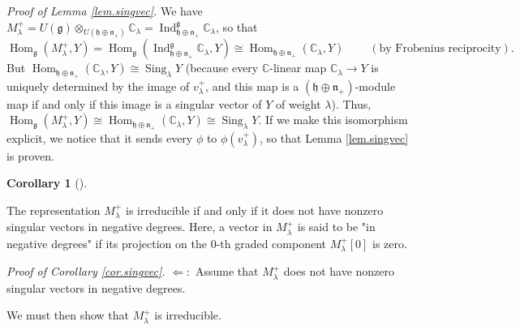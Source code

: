 \documentclass
[numbers=enddot,12pt,final,onecolumn,german,notitlepage]{scrartcl}%
\theoremstyle{definition}
\newtheorem{coro}[theo]{Corollary}
\newenvironment{corollary}[1][]
{\begin{coro}[#1]\begin{leftbar}}
{\end{leftbar}\end{coro}}
\begin{document}
\textit{Proof of Lemma \ref{lem.singvec}.} We have $M_{\lambda}^{+}=U\left(
\mathfrak{g}\right)  \otimes_{U\left(  \mathfrak{h}\oplus\mathfrak{n}%
_{+}\right)  }\mathbb{C}_{\lambda}=\operatorname*{Ind}\nolimits_{\mathfrak{h}%
\oplus\mathfrak{n}_{+}}^{\mathfrak{g}}\mathbb{C}_{\lambda}$, so that
\[
\operatorname*{Hom}\nolimits_{\mathfrak{g}}\left(  M_{\lambda}^{+},Y\right)
=\operatorname*{Hom}\nolimits_{\mathfrak{g}}\left(  \operatorname*{Ind}%
\nolimits_{\mathfrak{h}\oplus\mathfrak{n}_{+}}^{\mathfrak{g}}\mathbb{C}%
_{\lambda},Y\right)  \cong\operatorname*{Hom}\nolimits_{\mathfrak{h}%
\oplus\mathfrak{n}_{+}}\left(  \mathbb{C}_{\lambda},Y\right)
\ \ \ \ \ \ \ \ \ \ \left(  \text{by Frobenius reciprocity}\right)  .
\]
But $\operatorname*{Hom}\nolimits_{\mathfrak{h}\oplus\mathfrak{n}_{+}}\left(
\mathbb{C}_{\lambda},Y\right)  \cong\operatorname*{Sing}\nolimits_{\lambda}Y$
(because every $\mathbb{C}$-linear map $\mathbb{C}_{\lambda}\rightarrow Y$ is
uniquely determined by the image of $v_{\lambda}^{+}$, and this map is a
$\left(  \mathfrak{h}\oplus\mathfrak{n}_{+}\right)  $-module map if and only
if this image is a singular vector of $Y$ of weight $\lambda$). Thus,
$\operatorname*{Hom}\nolimits_{\mathfrak{g}}\left(  M_{\lambda}^{+},Y\right)
\cong\operatorname*{Hom}\nolimits_{\mathfrak{h}\oplus\mathfrak{n}_{+}}\left(
\mathbb{C}_{\lambda},Y\right)  \cong\operatorname*{Sing}\nolimits_{\lambda}Y$.
If we make this isomorphism explicit, we notice that it sends every $\phi$ to
$\phi\left(  v_{\lambda}^{+}\right)  $, so that Lemma \ref{lem.singvec} is proven.

\begin{corollary}
\label{cor.singvec}The representation $M_{\lambda}^{+}$ is irreducible if and
only if it does not have nonzero singular vectors in negative degrees. Here, a
vector in $M_{\lambda}^{+}$ is said to be "in negative degrees" if its
projection on the $0$-th graded component $M_{\lambda}^{+}\left[  0\right]  $
is zero.
\end{corollary}

\textit{Proof of Corollary \ref{cor.singvec}.} $\Longleftarrow:$ Assume that
$M_{\lambda}^{+}$ does not have nonzero singular vectors in negative degrees.

We must then show that $M_{\lambda}^{+}$ is irreducible.
\end{document}

